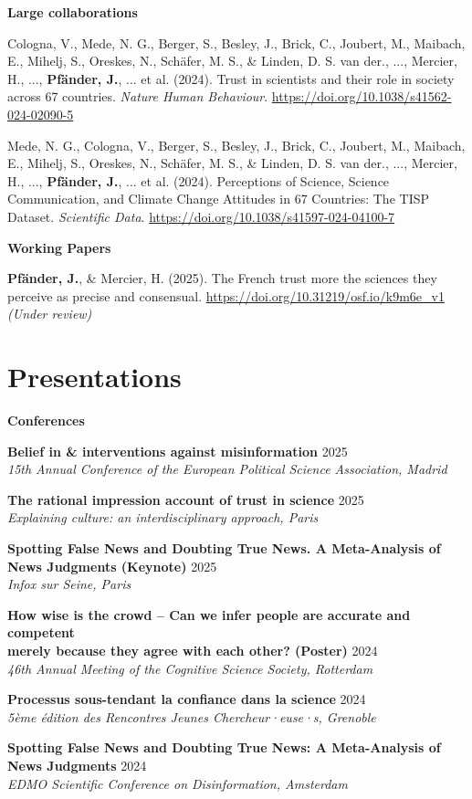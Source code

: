 \documentclass[letterpaper,11pt]{article}
\newcommand{\resumeItem}[1]{
  \item\small{
    {#1 \vspace{-2pt}}
  }
}
\newcommand{\resumeItemWithYear}[3][ ]{ %
  \item\small{
    #2 \hfill {\small #3} \\
    #1
  }
}
\newcommand{\resumePublicationHeading}[1]{
  \vspace{5pt} %
  \noindent\textbf{\small #1} %
  \vspace{2pt} %
}
\begin{document}
\resumePublicationHeading{Large collaborations}
\begin{enumerate}[label={[{\arabic*.}]}, left=0.15in, resume]
    \resumeItem{Cologna, V., Mede, N. G., Berger, S., Besley, J., Brick, C., Joubert, M., Maibach, E., Mihelj, S., Oreskes, N., Schäfer, M. S., & Linden, D. S. van der., ..., Mercier, H., ..., \textbf{Pfänder, J.}, ... et al. (2024). Trust in scientists and their role in society across 67 countries. \emph{Nature Human Behaviour}. \url{https://doi.org/10.1038/s41562-024-02090-5}
    }
    
    \resumeItem{Mede, N. G., Cologna, V., Berger, S., Besley, J., Brick, C., Joubert, M., Maibach, E., Mihelj, S., Oreskes, N., Schäfer, M. S., & Linden, D. S. van der., ..., Mercier, H., ..., \textbf{Pfänder, J.}, ... et al. (2024). Perceptions of Science, Science Communication, and Climate Change Attitudes in 67 Countries: The TISP Dataset. \emph{Scientific Data}. \url{https://doi.org/10.1038/s41597-024-04100-7} 
    }

\end{enumerate}

\resumePublicationHeading{Working Papers}
\begin{enumerate}[label={[{\arabic*.}]}, left=0.15in, resume]
    \resumeItem{\textbf{Pfänder, J.\footnotemark[1]}, & Mercier, H. (2025). The French trust more the sciences they perceive as precise and consensual. \url{https://doi.org/10.31219/osf.io/k9m6e_v1} \emph{(Under review)}
    }    

\end{enumerate}


\section{Presentations}

\resumePublicationHeading{Conferences}
\begin{enumerate}[label={[{\arabic*.}]}, left=0.15in]
    \resumeItemWithYear{\textbf{Belief in \& interventions against misinformation}}{2025}{\textit{15th Annual Conference of the European Political Science Association, Madrid}} 
    \resumeItemWithYear{\textbf{The rational impression account of trust in science}}{2025}{\textit{Explaining culture: an interdisciplinary approach, Paris}} 
    \resumeItemWithYear{\textbf{Spotting False News and Doubting True News. A Meta-Analysis of News Judgments  (Keynote)}}{2025}{\textit{Infox sur Seine, Paris}}    
    \resumeItemWithYear{\textbf{How wise is the crowd -- Can we infer people are accurate and competent \\ merely because they agree with each other? (Poster)}}{2024}{\textit{46th Annual Meeting of the Cognitive Science Society, Rotterdam}}
    \resumeItemWithYear{\textbf{Processus sous-tendant la confiance dans la science}}{2024}{\textit{5ème édition des Rencontres Jeunes Chercheur·euse·s, Grenoble}}
    \resumeItemWithYear{\textbf{Spotting False News and Doubting True News: A Meta-Analysis of News Judgments}}{2024}{\textit{EDMO Scientific Conference on Disinformation, Amsterdam}}
\end{enumerate}
\end{document}
